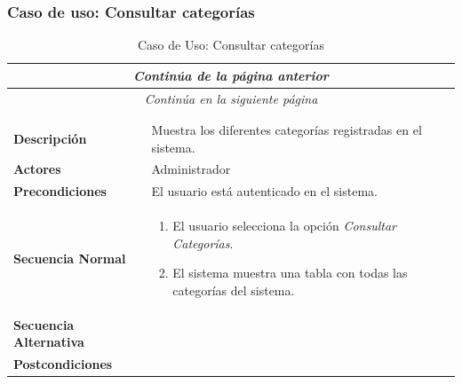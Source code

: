 \newpage
\subsubsection*{Caso de uso: Consultar categorías }
\begin{longtable}{| p{4cm} | p{10cm} |}
\endfirsthead
\multicolumn{2}{c}{\textit{Continúa de la página anterior}}\\[12pt]
\hline
\endhead
\hline
\multicolumn{2}{c}{\textit{Continúa en la siguiente página}} \\
\endfoot
\hline
\caption{Caso de Uso: Consultar categorías}\label{fig:1}\\
\endlastfoot


\hline
\multicolumn{2}{|c|}{\textbf{CU$<$41$>$ - Consultar Categorías}} \\

\hline
\textbf{Descripción} &
Muestra los diferentes categorías registradas en el sistema.\\

\hline
\textbf{Actores} &
Administrador\\

\hline
\textbf{Precondiciones} &
El usuario está autenticado en el sistema.\\

\hline
\textbf{Secuencia Normal} &\mbox{}\par\vspace{-\baselineskip}
\begin{enumerate}[leftmargin=0.7cm, topsep=0.1cm]
\item El usuario selecciona la opción \textit{Consultar Categorías}.
\item El sistema muestra una tabla con todas las categorías del sistema.
\end{enumerate}


\\
\hline
\textbf{Secuencia Alternativa} &\mbox{}\par\vspace{-\baselineskip}
\\

\hline
\textbf{Postcondiciones} & \\
\hline
\end{longtable}



\newpage
